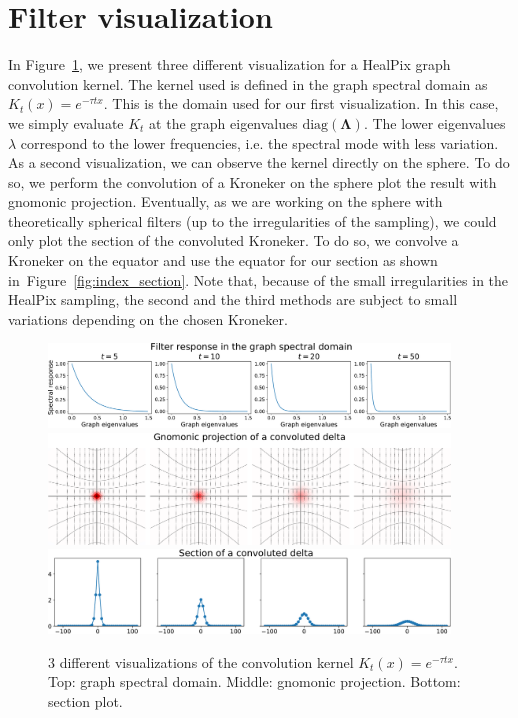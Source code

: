 \documentclass[final,twocolumn,3p,times,authoryear]{elsarticle}
\newcommand{\figref}[1]{Figure~\ref{fig:#1}}
\renewcommand{\b}[1]{{\bm{#1}}}   %
\newcommand{\1}{\b{1}}              %
\newcommand{\0}{\b{0}}              %
\newcommand{\bLambda}{\b{\Lambda}}
\begin{document}
\section{Filter visualization}
\label{sec:filter_visualization}

In \figref{gaussian_filters_visualization}, we present three different
visualization for a HealPix graph convolution kernel. The kernel used is defined in the graph spectral domain as $K_t(x)=e^{-\tau t x}$. This is the domain used for our first visualization. In this case, we simply evaluate $K_t$
at the graph eigenvalues $\text{diag}(\bLambda)$. The lower eigenvalues $\lambda$ correspond to the lower frequencies, i.e. the spectral mode with less variation.
As a second visualization, we can observe the kernel directly on the sphere. To do so, we perform the convolution of a
Kroneker on the sphere plot the result with gnomonic projection. Eventually, as we are
working on the sphere with theoretically spherical filters (up to the irregularities of the sampling), we could only plot the section of the convoluted Kroneker. To do so, we convolve a Kroneker on the equator and use the equator for our section as shown in~\figref{index_section}. Note that, because of the small irregularities in the HealPix
sampling, the second and the third methods are subject to small variations depending on the
chosen Kroneker.

\begin{figure}[!ht]
\centering
\includegraphics[width=0.95\textwidth]{figures/gaussian_filters_spectral.pdf}
\includegraphics[width=0.95\textwidth]{figures/gaussian_filters_gnomonic.pdf}
\includegraphics[width=0.95\textwidth]{figures/gaussian_filters_section.pdf}
\caption{3 different visualizations of the convolution kernel $K_t(x)=e^{-\tau t x}$.
Top: graph spectral domain.
Middle: gnomonic projection.
Bottom: section plot.}
\label{fig:gaussian_filters_visualization}
\end{figure}
\end{document}
